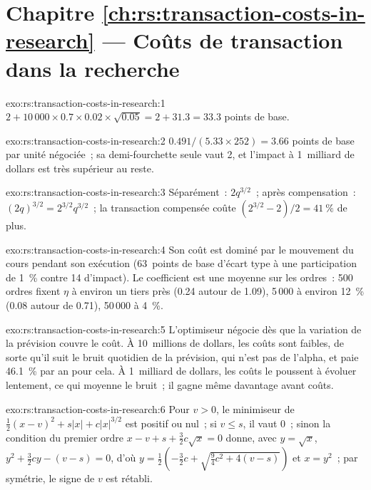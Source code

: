 \section*{Chapitre \ref{ch:rs:transaction-costs-in-research} --- Coûts de transaction dans la recherche}

\begin{solution}{exo:rs:transaction-costs-in-research:1}
$2 + 10\,000 \times 0.7 \times 0.02 \times \sqrt{0.05} = 2 + 31.3 = 33.3$ points de base.
\end{solution}

\begin{solution}{exo:rs:transaction-costs-in-research:2}
$0.491/(5.33 \times 252) = 3.66$ points de base par unité négociée~; sa demi-fourchette seule vaut 2, et l'impact à 1~milliard de dollars est très supérieur au reste.
\end{solution}

\begin{solution}{exo:rs:transaction-costs-in-research:3}
Séparément~: $2q^{3/2}$~; après compensation~: $(2q)^{3/2} = 2^{3/2}q^{3/2}$~; la transaction compensée coûte $(2^{3/2} - 2)/2 = 41~\%$ de plus.
\end{solution}

\begin{solution}{exo:rs:transaction-costs-in-research:4}
Son coût est dominé par le mouvement du cours pendant son exécution (63~points de base d'écart type à une participation de 1~\% contre 14 d'impact). Le coefficient est une
moyenne sur les ordres~: 500 ordres fixent $\eta$ à environ un tiers près (0.24 autour de 1.09), 5\,000 à environ 12~\% (0.08 autour de 0.71), 50\,000 à 4~\%.
\end{solution}

\begin{solution}{exo:rs:transaction-costs-in-research:5}
L'optimiseur négocie dès que la variation de la prévision couvre le coût. À 10~millions de dollars, les coûts sont faibles, de sorte qu'il suit le bruit quotidien de la prévision, qui n'est pas
de l'alpha, et paie 46.1~\% par an pour cela. À 1~milliard de dollars, les coûts le poussent à évoluer lentement, ce qui moyenne le bruit~; il gagne même davantage avant coûts.
\end{solution}

\begin{solution}{exo:rs:transaction-costs-in-research:6}
Pour $v > 0$, le minimiseur de $\frac12(x - v)^2 + s\lvert x\rvert + c\lvert x\rvert^{3/2}$ est positif ou nul~; si $v \le s$, il vaut 0~; sinon la condition du premier ordre
$x - v + s + \frac32 c\sqrt x = 0$ donne, avec $y = \sqrt x$, $y^2 + \frac32 cy - (v - s) = 0$, d'où $y = \frac12(-\frac32 c + \sqrt{\frac94 c^2 + 4(v - s)})$ et
$x = y^2$~; par symétrie, le signe de $v$ est rétabli.
\end{solution}


